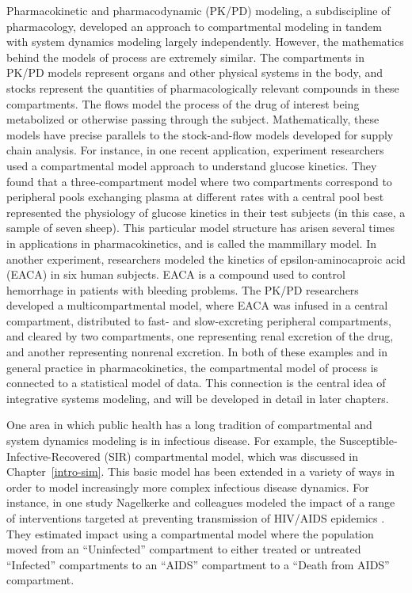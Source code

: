 Pharmacokinetic and pharmacodynamic (PK/PD) modeling, a subdiscipline
of pharmacology, developed an approach to compartmental modeling in
tandem with system dynamics modeling largely independently.  However,
the mathematics behind the models of process are extremely
similar. The compartments in PK/PD models represent organs and other
physical systems in the body, and stocks represent the quantities of
pharmacologically relevant compounds in these compartments.  The flows
model the process of the drug of interest being metabolized or
otherwise passing through the subject. Mathematically, these models
have precise parallels to the stock-and-flow models developed for
supply chain analysis. For instance, in one recent application,
experiment researchers used a compartmental model approach to
understand glucose kinetics.\cite{Gastaldelli_Glucose_1997} They found
that a three-compartment model where two compartments correspond to
peripheral pools exchanging plasma at different rates with a central
pool best represented the physiology of glucose kinetics in their test
subjects (in this case, a sample of seven sheep). This particular
model structure has arisen several times in applications in
pharmacokinetics, and is called the mammillary model. In another
experiment, researchers modeled the kinetics of epsilon-aminocaproic
acid (EACA) in six human subjects. EACA is a compound used to control
hemorrhage in patients with bleeding problems. The PK/PD researchers
developed a multicompartmental model, where EACA was infused in a
central compartment, distributed to fast- and slow-excreting
peripheral compartments, and cleared by two compartments, one
representing renal excretion of the drug, and another representing
nonrenal excretion.\cite{Frederiksen_Kinetics_1984} In both of these
examples and in general practice in pharmacokinetics, the
compartmental model of process is connected to a statistical model of
data. This connection is the central idea of integrative systems
modeling, and will be developed in detail in later chapters.



One area in which public health has a long tradition of compartmental
and system dynamics modeling is in infectious
disease.\cite{Anderson_Infectious_1991, Hethcote_Qualitative_1976,
  Blower Hypercube sampling} For example, the
Susceptible-Infective-Recovered (SIR) compartmental model, which was
discussed in Chapter~\ref{intro-sim}. This basic model has been
extended in a variety of ways in order to model increasingly more
complex infectious disease dynamics. For instance, in one study
Nagelkerke and colleagues modeled the impact of a range of
interventions targeted at preventing transmission of HIV/AIDS
epidemics \cite{ref}. They estimated impact using a compartmental
model where the population moved from an ``Uninfected'' compartment to
either treated or untreated ``Infected'' compartments to an ``AIDS''
compartment to a ``Death from AIDS'' compartment.

